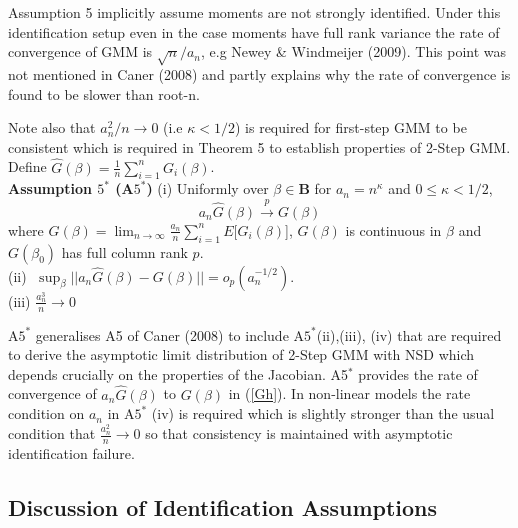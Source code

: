 \documentclass[11pt, fleqn]{article}
\begin{document}
Assumption 5 implicitly assume moments are not strongly identified. Under this identification setup  even in the case moments have full rank variance the rate of convergence of GMM is $\sqrt{n}/a_n$, e.g Newey \& Windmeijer (2009). This point was not mentioned in Caner (2008) and partly explains why the rate of convergence is found to be slower than root-n.

Note  also that $a_n^2/n\rightarrow 0$ (i.e $\kappa<1/2$) is required for first-step GMM  to be consistent which is required in Theorem 5 to establish properties of 2-Step GMM.\\
  
      
 

 

Define $\hat{G}(\beta)=\frac{1}{n} \sum_{i=1}^n G_i(\beta)$.\\

  \textbf{Assumption $5^*$ (A$5^*$)} (i) Uniformly over $\beta \in \mathbf{B}$ for $a_n=n^{\kappa}$ and $0\leq \kappa <1/2$,
  \begin{equation}\label{Gh} a_n\hat{G}(\beta)\overset{p}{\rightarrow} G(\beta) \end{equation}
  where $G(\beta)=\lim_{n\rightarrow \infty} \frac{a_n}{n} \sum_{i=1}^nE[G_i(\beta)$], $G(\beta)$ is continuous in $\beta$ and $G(\beta_0)$ has full column rank $p$.\\
(ii)  $\;\sup_{\beta} |\!|a_n\hat{G}(\beta)-G(\beta)|\!|=o_p(a_n^{-1/2}) $.\\
  (iii) $\frac{a_n^3}{n}\rightarrow 0$
  

 A$5^*$ generalises A5 of Caner (2008) to include A$5^*$(ii),(iii), (iv) that  are required to derive the asymptotic limit distribution of 2-Step GMM with NSD which depends crucially on the properties of the Jacobian.  A5$^*$ provides the rate of convergence of $a_n\hat{G}(\beta)$ to $G(\beta)$ in (\ref{Gh}). In non-linear models the rate condition on $a_n$ in A$5^*$ (iv) is required  which is slightly stronger than the usual condition that $\frac{a_n^2}{n}\rightarrow 0$ so that consistency is maintained with asymptotic identification failure. 
\subsection{Discussion of Identification Assumptions }
\end{document}
